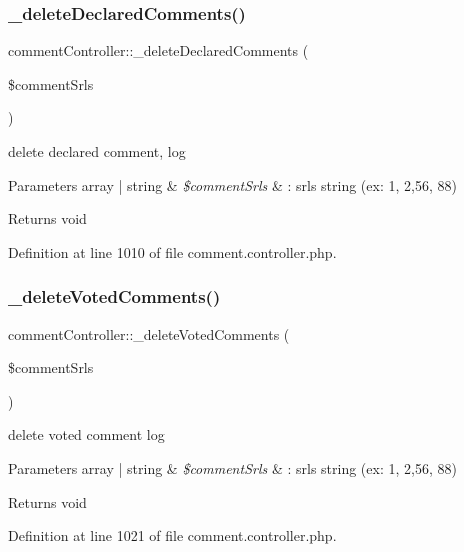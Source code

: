 \subsubsection{\texorpdfstring{\+\_\+delete\+Declared\+Comments()}{\_deleteDeclaredComments()}}
{\footnotesize\ttfamily comment\+Controller\+::\+\_\+delete\+Declared\+Comments (\begin{DoxyParamCaption}\item[{}]{\$comment\+Srls }\end{DoxyParamCaption})}

delete declared comment, log 
\begin{DoxyParams}[1]{Parameters}
array | string & {\em \$comment\+Srls} & \+: srls string (ex\+: 1, 2,56, 88) \\
\hline
\end{DoxyParams}
\begin{DoxyReturn}{Returns}
void 
\end{DoxyReturn}


Definition at line 1010 of file comment.\+controller.\+php.

\mbox{\label{classcommentController_a0e4216451f3bb1c02aeec98bb4f54ddc}} 
\subsubsection{\texorpdfstring{\+\_\+delete\+Voted\+Comments()}{\_deleteVotedComments()}}
{\footnotesize\ttfamily comment\+Controller\+::\+\_\+delete\+Voted\+Comments (\begin{DoxyParamCaption}\item[{}]{\$comment\+Srls }\end{DoxyParamCaption})}

delete voted comment log 
\begin{DoxyParams}[1]{Parameters}
array | string & {\em \$comment\+Srls} & \+: srls string (ex\+: 1, 2,56, 88) \\
\hline
\end{DoxyParams}
\begin{DoxyReturn}{Returns}
void 
\end{DoxyReturn}


Definition at line 1021 of file comment.\+controller.\+php.

